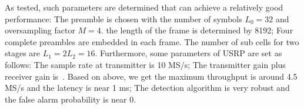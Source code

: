 As tested, such parameters are determined that can achieve a relatively good performance: 
The preamble is chosen with the number of symbols $L_0=32$ and oversampling factor $M=4$.
the length of the frame is determined by 8192; Four complete preambles are embedded in each frame. 
The number of sub cells for two stages are $L_1=2L_2=16$. Furthermore, some parameters of USRP are set as follows:
The sample rate at transmitter is 10 MS/s; The transmitter gain plus receiver gain is~\dB.
Based on above, we get the maximum throughput is around 4.5 MS/s and the latency is near 1 ms;
The detection algorithm is very robust and the false alarm probability is near 0.


